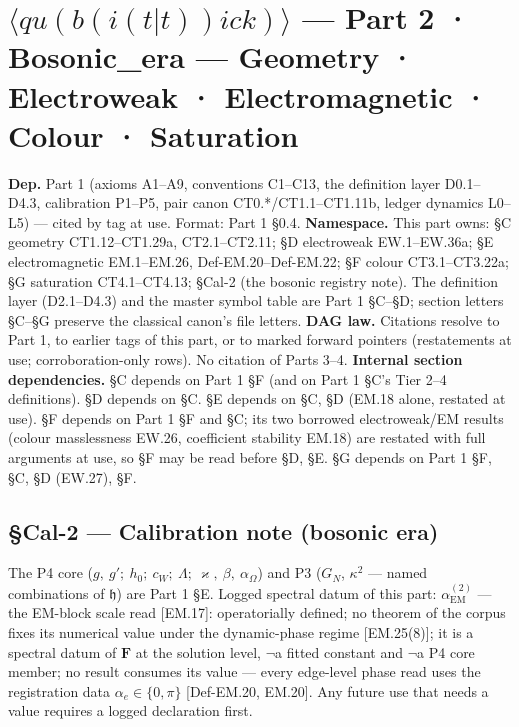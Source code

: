 \chapter{\texorpdfstring{$\langle qu(b(i(t|t))ick)\rangle$ — \textbf{Part 2 · Bosonic\_era} — Geometry · Electroweak · Electromagnetic · Colour · Saturation}{Qubitick - **Part 2 - Bosonic _era** - Geometry - Electroweak - Electromagnetic - Colour - Saturation}}

\textbf{Dep.} Part 1 (axioms A1–A9, conventions C1–C13, the definition layer D0.1–D4.3, calibration P1–P5, pair canon CT0.*/CT1.1–CT1.11b, ledger dynamics L0–L5) — cited by tag at use. Format: Part 1 §0.4. \textbf{Namespace.} This part owns: §C geometry CT1.12–CT1.29a, CT2.1–CT2.11; §D electroweak EW.1–EW.36a; §E electromagnetic EM.1–EM.26, Def-EM.20–Def-EM.22; §F colour CT3.1–CT3.22a; §G saturation CT4.1–CT4.13; §Cal-2 (the bosonic registry note). The definition layer (D2.1–D4.3) and the master symbol table are Part 1 §C–§D; section letters §C–§G preserve the classical canon's file letters. \textbf{DAG law.} Citations resolve to Part 1, to earlier tags of this part, or to marked forward pointers (restatements at use; corroboration-only rows). No citation of Parts 3–4. \textbf{Internal section dependencies.} §C depends on Part 1 §F (and on Part 1 §C's Tier 2–4 definitions). §D depends on §C. §E depends on §C, §D (EM.18 alone, restated at use). §F depends on Part 1 §F and §C; its two borrowed electroweak/EM results (colour masslessness EW.26, coefficient stability EM.18) are restated with full arguments at use, so §F may be read before §D, §E. §G depends on Part 1 §F, §C, §D (EW.27), §F.

\section[§Cal-2 — Calibration note (bosonic era)]{\texorpdfstring{§Cal-2 — Calibration note (bosonic era)}{SCal-2 - Calibration note (bosonic era)}}

The P4 core ($g,\ g';\ h_0;\ c_W;\ \Lambda;\ \varkappa,\ \beta,\ \alpha_\Omega$) and P3 ($G_N$, $\kappa^2$ — named combinations of $\mathfrak h$) are Part 1 §E. Logged spectral datum of this part: $\alpha_{\mathrm{EM}}^{(2)}$ — the EM-block scale read [EM.17]: operatorially defined; no theorem of the corpus fixes its numerical value under the dynamic-phase regime [EM.25(8)]; it is a spectral datum of $\mathbf F$ at the solution level, $\neg$a fitted constant and $\neg$a P4 core member; no result consumes its value — every edge-level phase read uses the registration data $\alpha_e\in\{0,\pi\}$ [Def-EM.20, EM.20]. Any future use that needs a value requires a logged declaration first.

